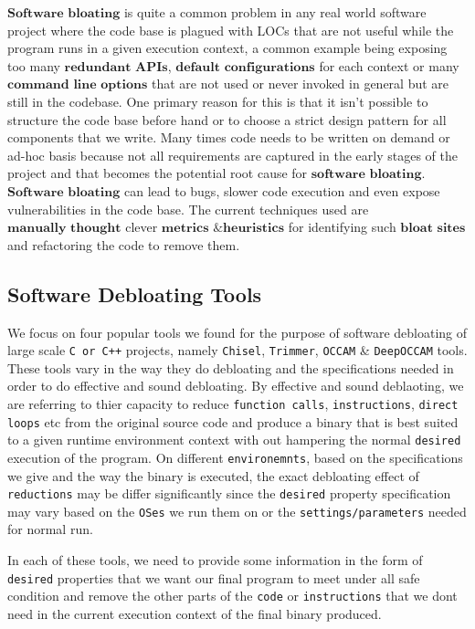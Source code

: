 \documentclass{relatorio}
\begin{document}
$\textbf{Software bloating}$ is quite a common problem in any real world software project where the code base is plagued with LOCs that are not useful while the program runs in a given execution context, a common example being exposing too many $\textbf{redundant APIs}$, $\textbf{default configurations}$ for each context or many $\textbf{command line options}$ that are not used or never invoked in general but are still in the codebase. One primary reason for this is that it isn't possible to structure the code base before hand or to choose a strict design pattern for all components that we write. Many times code needs to be written on demand or ad-hoc basis because not all requirements are captured in the early stages of the project and that becomes the potential root cause for $\textbf{software bloating}$. $\textbf{Software bloating}$ can lead to bugs, slower code execution and even expose vulnerabilities in the code base. The current techniques used are $\textbf{manually thought}$ clever $\textbf{metrics \& heuristics}$ for identifying such $\textbf{bloat sites}$ and refactoring the code to remove them. 

\subsection{Software Debloating Tools}%

We focus on four popular tools we found for the purpose of software debloating of large scale \texttt{C or C++} projects, namely \texttt{Chisel}, \texttt{Trimmer}, \texttt{OCCAM} \& \texttt{DeepOCCAM} tools. These tools vary in the way they do debloating and the specifications needed in order to do effective and sound debloating. By effective and sound deblaoting, we are referring to thier capacity to reduce \texttt{function calls}, \texttt{instructions}, \texttt{direct loops} etc from the original source code and produce a binary that is best suited to a given runtime 
environment context with out hampering the normal \texttt{desired} execution of the program. On different \texttt{environemnts}, based on the specifications we give and the way the binary is executed, the exact debloating effect of \texttt{reductions} may be differ significantly since the \texttt{desired} property specification may vary based on the \texttt{OSes} we run them on or the \texttt{settings/parameters} needed for normal run. 

In each of these tools, we need to provide some information in the form of \texttt{desired} properties that we want our final program to meet under all safe condition and remove the other parts of the \texttt{code} or \texttt{instructions} that we dont need in the current execution context of the final binary produced.  
\end{document}
